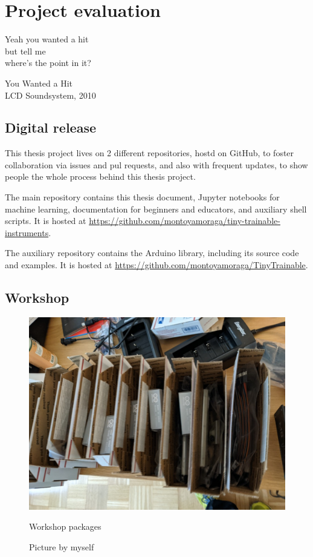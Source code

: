 \chapter{Project evaluation}

\epigraph{Yeah you wanted a hit \\ but tell me \\ where's the point in it?}{You Wanted a Hit \\ LCD Soundsystem, 2010}

\section{Digital release}

This thesis project lives on 2 different repositories, hostd on GitHub, to foster collaboration via issues and pul requests, and also with frequent updates, to show people the whole process behind this thesis project.

The main repository contains this thesis document, Jupyter notebooks for machine learning, documentation for beginners and educators, and auxiliary shell scripts. It is hosted at \url{https://github.com/montoyamoraga/tiny-trainable-instruments}.

The auxiliary repository contains the Arduino library, including its source code and examples. It is hosted at \url{https://github.com/montoyamoraga/TinyTrainable}.

\section{Workshop}

\begin{figure}[ht]
  \centering
  \includegraphics[width=0.75\linewidth,height=0.25\textheight,keepaspectratio]{images/workshop-packages.jpg}
  \caption{Workshop packages}
  \caption*{Picture by myself}
  \label{fig:workshop-packages}
\end{figure}

